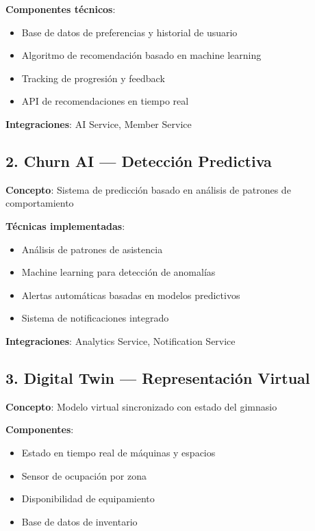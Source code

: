 \documentclass[11pt,a4paper]{article}
\begin{document}
\begin{itemize}
\textbf{Componentes técnicos}:
\begin{itemize}
    \item Base de datos de preferencias y historial de usuario
    \item Algoritmo de recomendación basado en machine learning
    \item Tracking de progresión y feedback
    \item API de recomendaciones en tiempo real
\end{itemize}

\textbf{Integraciones}: AI Service, Member Service

\subsection{2. Churn AI — Detección Predictiva}

\begin{definicion}
\textbf{Concepto}: Sistema de predicción basado en análisis de patrones de comportamiento
\end{definicion}

\textbf{Técnicas implementadas}:
\begin{itemize}
    \item Análisis de patrones de asistencia
    \item Machine learning para detección de anomalías
    \item Alertas automáticas basadas en modelos predictivos
    \item Sistema de notificaciones integrado
\end{itemize}

\textbf{Integraciones}: Analytics Service, Notification Service

\subsection{3. Digital Twin — Representación Virtual}

\begin{definicion}
\textbf{Concepto}: Modelo virtual sincronizado con estado del gimnasio
\end{definicion}

\textbf{Componentes}:
\begin{itemize}
    \item Estado en tiempo real de máquinas y espacios
    \item Sensor de ocupación por zona
    \item Disponibilidad de equipamiento
    \item Base de datos de inventario
\end{itemize}


\end{itemize}
\end{document}
